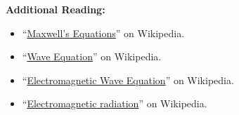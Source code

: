 
{\bf Additional Reading:}
\begin{itemize}
\item ``\href{https://en.wikipedia.org/wiki/Maxwell's_equations}{Maxwell's Equations}'' on Wikipedia.
\item ``\href{https://en.wikipedia.org/wiki/Wave_equation}{Wave Equation}'' on Wikipedia.
\item ``\href{https://en.wikipedia.org/wiki/Electromagnetic_wave_equation}{Electromagnetic Wave Equation}'' on Wikipedia.
\item ``\href{https://en.wikipedia.org/wiki/Electromagnetic_radiation}{Electromagnetic radiation}'' on Wikipedia.
\end{itemize}
